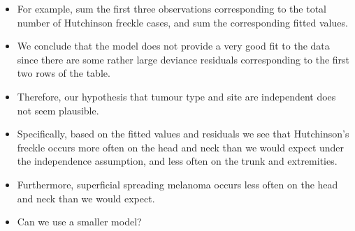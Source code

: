 \documentclass{article}\usepackage[]{graphicx}\usepackage[svgnames]{xcolor}
\begin{document}
\begin{itemize}
    \item For example, sum the first three observations corresponding to the total number of
          Hutchinson freckle cases, and sum the corresponding fitted values.
    \item We conclude that the model does not provide a very good fit to the data since
          there are some rather large deviance residuals corresponding to the first two rows
          of the table.
    \item Therefore, our hypothesis that tumour type and site are independent does not
          seem plausible.
    \item Specifically, based on the fitted values and residuals we see that Hutchinson's
          freckle occurs more often on the head and neck than we would expect under the
          independence assumption, and less often on the trunk and extremities.
    \item Furthermore, superficial spreading melanoma occurs less often on the head and
          neck than we would expect.
    \item Can we use a smaller model?
\end{itemize}
\end{document}
